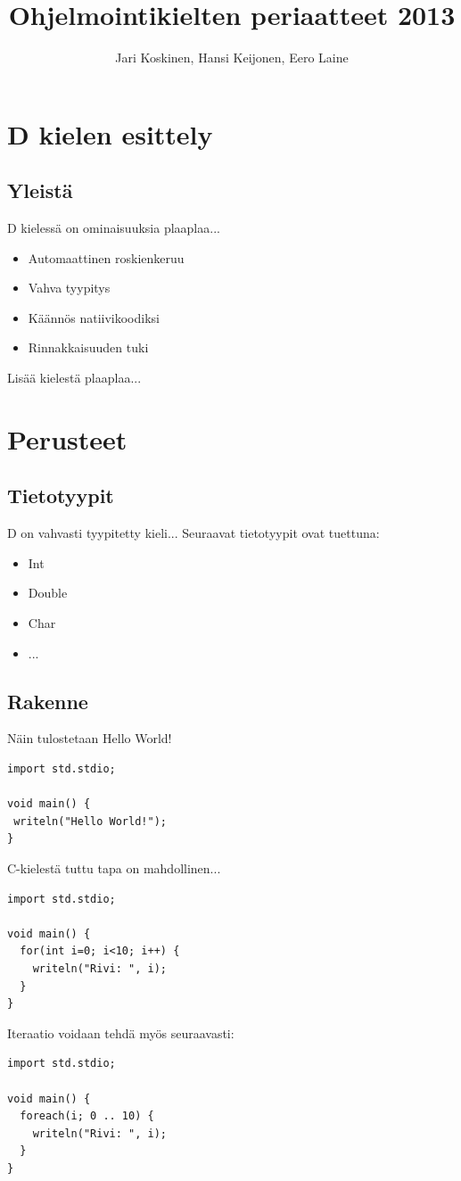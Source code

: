 \documentclass[11pt,oneside,a4paper]{article}
\author{Jari Koskinen, Hansi Keijonen, Eero Laine}
\title{Ohjelmointikielten periaatteet 2013}
\begin{document}
\maketitle

\pagebreak

\tableofcontents

\pagebreak

\section{D kielen esittely}
\subsection{Yleistä}
D kielessä on ominaisuuksia plaaplaa...
\begin{itemize}
\item Automaattinen roskienkeruu
\item Vahva tyypitys
\item Käännös natiivikoodiksi
\item Rinnakkaisuuden tuki
\end{itemize}
Lisää kielestä plaaplaa...

\section{Perusteet}
\subsection{Tietotyypit}
D on vahvasti tyypitetty kieli...
Seuraavat tietotyypit ovat tuettuna:
\begin{itemize}
\item Int
\item Double
\item Char
\item ...
\end{itemize}
\subsection{Rakenne}
Näin tulostetaan Hello World!
\begin{verbatim}
import std.stdio;

void main() {
 writeln("Hello World!");
}
\end{verbatim}
C-kielestä tuttu tapa on mahdollinen...

\begin{verbatim}
import std.stdio;

void main() {
  for(int i=0; i<10; i++) {
    writeln("Rivi: ", i);
  }
}
\end{verbatim}
Iteraatio voidaan tehdä myös seuraavasti:
\begin{verbatim}
import std.stdio;

void main() {
  foreach(i; 0 .. 10) {
    writeln("Rivi: ", i);
  }
}
\end{verbatim}
\end{document}

